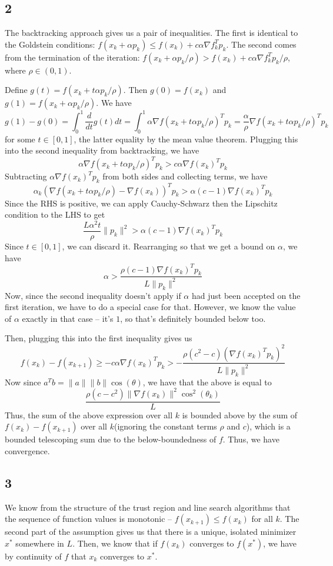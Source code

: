 \documentclass{article}
\begin{document}
\subsection*{2}
The backtracking approach gives us a pair of inequalities. The first is identical to the Goldstein conditions:  $f(x_k+\alpha p_k)\leq f(x_k)+c\alpha\nabla f_k^Tp_k$. The second comes from the termination of the iteration: $f(x_k+\alpha p_k/\rho)>f(x_k)+c\alpha\nabla f_k^Tp_k/\rho$, where $\rho\in(0,1)$.

Define $g(t)=f(x_k+t\alpha p_k/\rho)$. Then $g(0)=f(x_k)$ and $g(1)=f(x_k+\alpha p_k/\rho)$. We have 
\[g(1)-g(0)=\int_0^1\frac{d}{dt}g(t)dt=\int_0^1\alpha\nabla f(x_k+t\alpha p_k/\rho)^Tp_k=\frac{\alpha}{\rho}\nabla f(x_k+t\alpha p_k/\rho)^Tp_k\]
for some $t\in[0,1]$, the latter equality by the mean value theorem. Plugging this into the second inequality from backtracking, we have
\[\alpha\nabla f(x_k+t\alpha p_k/\rho)^Tp_k>c\alpha\nabla f(x_k)^Tp_k\]
Subtracting $\alpha\nabla f(x_k)^Tp_k$ from both sides and collecting terms, we have
\[\alpha_k\left(\nabla f(x_k+t\alpha p_k/\rho)-\nabla f(x_k)\right)^Tp_k>\alpha(c-1)\nabla f(x_k)^Tp_k\]
Since the RHS is positive, we can apply Cauchy-Schwarz then the Lipschitz condition to the LHS to get
\[\frac{L\alpha^2t}{\rho}\|p_k\|^2>\alpha(c-1)\nabla f(x_k)^Tp_k\]
Since $t\in[0,1]$, we can discard it. Rearranging so that we get a bound on $\alpha$, we have 
\[\alpha>\frac{\rho(c-1)\nabla f(x_k)^Tp_k}{L\|p_k\|^2}\]
Now, since the second inequality doesn't apply if $\alpha$ had just been accepted on the first iteration, we have to do a special case for that. However, we know the value of $\alpha$ exactly in that case -- it's $1$, so that's definitely bounded below too.

Then, plugging this into the first inequality gives us
\[f(x_k)-f(x_{k+1})\geq-c\alpha\nabla f(x_k)^Tp_k>-\frac{\rho(c^2-c)\left(\nabla f(x_k)^Tp_k\right)^2}{L\|p_k\|^2}\]
Now since $a^Tb=\|a\|\|b\|\cos(\theta)$, we have that the above is equal to 
\[\frac{\rho(c-c^2)\|\nabla f(x_k)\|^2\cos^2(\theta_k)}{L}\]
Thus, the sum of the above expression over all $k$ is bounded above by the sum of $f(x_k)-f(x_{k+1})$ over all $k$(ignoring the constant terms $\rho$ and $c$), which is a bounded telescoping sum due to the below-boundedness of $f$. Thus, we have convergence.
\subsection*{3}
We know from the structure of the trust region and line search algorithms that the sequence of function values is monotonic -- $f(x_{k+1})\leq f(x_k)$ for all $k$. The second part of the assumption gives us that there is a unique, isolated minimizer $x^*$ somewhere in $L$. Then, we know that if $f(x_k)$ converges to $f(x^*)$, we have by continuity of $f$ that $x_k$ converges to $x^*$.
\end{document}
